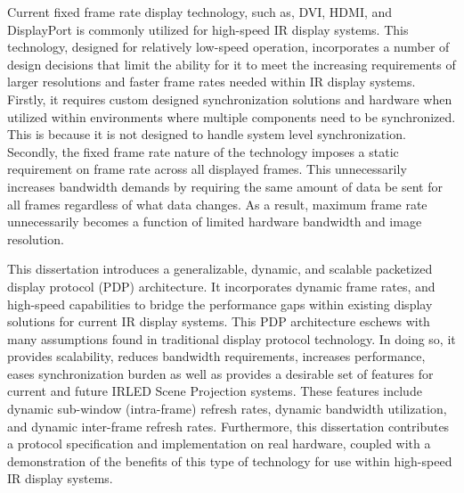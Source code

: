 Current fixed frame rate display technology, such as, DVI, HDMI, and DisplayPort is commonly utilized for high-speed IR display systems. This technology, designed for relatively low-speed operation, incorporates a number of design decisions that limit the ability for it to meet the increasing requirements of larger resolutions and faster frame rates needed within IR display systems. Firstly, it requires custom designed synchronization solutions and hardware when utilized within environments where multiple components need to be synchronized. This is because it is not designed to handle system level synchronization. Secondly, the fixed frame rate nature of the technology imposes a static requirement on frame rate across all displayed frames. This unnecessarily increases bandwidth demands by requiring the same amount of data be sent for all frames regardless of what data changes. As a result, maximum frame rate unnecessarily becomes a function of limited hardware bandwidth and image resolution.

This dissertation introduces a generalizable, dynamic, and scalable packetized display protocol (PDP) architecture. It incorporates dynamic frame rates, and high-speed capabilities to bridge the performance gaps within existing display solutions for current IR display systems. This PDP architecture eschews with many assumptions found in traditional display protocol technology. In doing so, it provides scalability, reduces bandwidth requirements, increases performance, eases synchronization burden as well as provides a desirable set of features for current and future IRLED Scene Projection systems. These features include dynamic sub-window (intra-frame) refresh rates, dynamic bandwidth utilization, and dynamic inter-frame refresh rates. Furthermore, this dissertation contributes a protocol specification and implementation on real hardware, coupled with a demonstration of the benefits of this type of technology for use within high-speed IR display systems.
